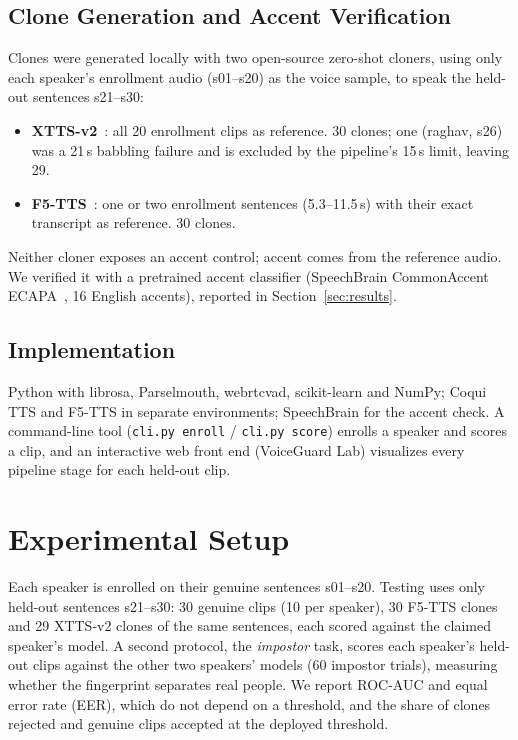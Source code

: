 \documentclass[11pt,a4paper]{article}
\begin{document}
\subsection{Clone Generation and Accent Verification}
Clones were generated locally with two open-source zero-shot cloners, using only each speaker's enrollment audio (s01--s20) as the voice sample, to speak the held-out sentences s21--s30:
\begin{itemize}
\item \textbf{XTTS-v2}~\cite{xtts}: all 20 enrollment clips as reference. 30 clones; one (raghav, s26) was a 21\,s babbling failure and is excluded by the pipeline's 15\,s limit, leaving 29.
\item \textbf{F5-TTS}~\cite{f5tts}: one or two enrollment sentences (5.3--11.5\,s) with their exact transcript as reference. 30 clones.
\end{itemize}
Neither cloner exposes an accent control; accent comes from the reference audio. We verified it with a pretrained accent classifier (SpeechBrain CommonAccent ECAPA~\cite{commonaccent}, 16 English accents), reported in Section~\ref{sec:results}.

\subsection{Implementation}
Python with librosa, Parselmouth, webrtcvad, scikit-learn and NumPy; Coqui TTS and F5-TTS in separate environments; SpeechBrain for the accent check. A command-line tool (\texttt{cli.py enroll} / \texttt{cli.py score}) enrolls a speaker and scores a clip, and an interactive web front end (VoiceGuard Lab) visualizes every pipeline stage for each held-out clip.


\section{Experimental Setup}
\label{sec:setup}
Each speaker is enrolled on their genuine sentences s01--s20. Testing uses only held-out sentences s21--s30: 30 genuine clips (10 per speaker), 30 F5-TTS clones and 29 XTTS-v2 clones of the same sentences, each scored against the claimed speaker's model. A second protocol, the \emph{impostor} task, scores each speaker's held-out clips against the other two speakers' models (60 impostor trials), measuring whether the fingerprint separates real people. We report ROC-AUC and equal error rate (EER), which do not depend on a threshold, and the share of clones rejected and genuine clips accepted at the deployed threshold.
\end{document}
